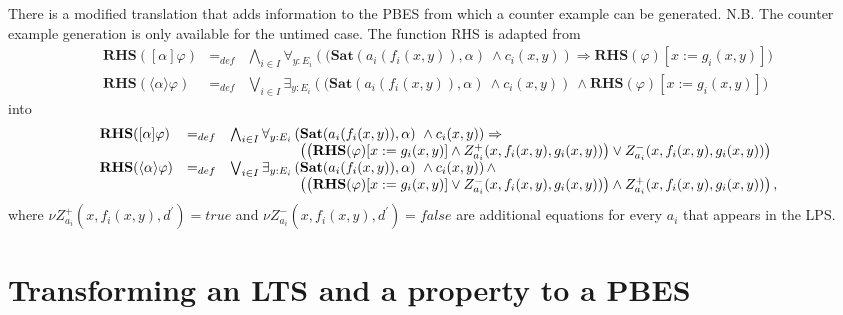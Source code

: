 \documentclass{article}
\begin{document}
There is a modified translation that adds information to the PBES from which
a counter example can be generated. N.B. The counter example generation is
only available for the untimed case. The function RHS is adapted from%
\begin{equation*}
\begin{array}{lll}
{\mathbf{RHS}}([\alpha ]\varphi ) & =_{def} & \bigwedge_{i{\in }I}\forall _{y%
{:}E_{i}}\left( (\mathbf{Sat}(a_{i}(f_{i}(x,y)),\alpha )\ \wedge
c_{i}(x,y)\right) \Rightarrow {\mathbf{RHS}}(\varphi )[x:=g_{i}(x,y)]) \\
{\mathbf{RHS}}(\langle \alpha \rangle \varphi ) & =_{def} & \bigvee_{i{\in }%
I}\exists _{y{:}E_{i}}\left( (\mathbf{Sat}(a_{i}(f_{i}(x,y)),\alpha )\
\wedge c_{i}(x,y)\right) \ \wedge {\mathbf{RHS}}(\varphi )[x:=g_{i}(x,y)])%
\end{array}%
\end{equation*}%
into%
\begin{equation*}
\begin{array}{lll}
{\mathbf{RHS}}([\alpha ]\varphi ) & =_{def} & \bigwedge_{i{\in }I}\forall _{y%
{:}E_{i}}\left( \mathbf{Sat}(a_{i}(f_{i}(x,y)),\alpha )\ \wedge
c_{i}(x,y)\right) \Rightarrow \\
&  & \phantom{\bigwedge_{i {\in} I} \forall_{y {:} E_i}(}\left( \left( {%
\mathbf{RHS}}(\varphi )[x:=g_{i}(x,y)]\wedge
Z_{a_{i}}^{+}(x,f_{i}(x,y),g_{i}(x,y))\right) \vee
Z_{a_{i}}^{-}(x,f_{i}(x,y),g_{i}(x,y))\right) \\
{\mathbf{RHS}}(\langle \alpha \rangle \varphi ) & =_{def} & \bigvee_{i{\in }%
I}\exists _{y{:}E_{i}}\left( \mathbf{Sat}(a_{i}(f_{i}(x,y)),\alpha )\ \wedge
c_{i}(x,y)\right) \wedge \\
&  & \phantom{\bigwedge_{i {\in} I} \forall_{y {:} E_i}(}\left( \left( {%
\mathbf{RHS}}(\varphi )[x:=g_{i}(x,y)]\vee
Z_{a_{i}}^{-}(x,f_{i}(x,y),g_{i}(x,y))\right) \wedge
Z_{a_{i}}^{+}(x,f_{i}(x,y),g_{i}(x,y))\right) ,%
\end{array}%
\end{equation*}%
where $\nu Z_{a_{i}}^{+}(x,f_{i}(x,y),d^{\prime })=true$ and $\nu
Z_{a_{i}}^{-}(x,f_{i}(x,y),d^{\prime })=false$ are additional equations for
every $a_{i}$ that appears in the LPS.

\newpage

\section{Transforming an LTS and a property to a PBES}
\end{document}
